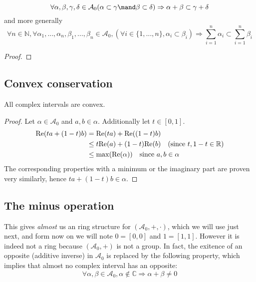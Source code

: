 \begin{prop}[Sum]
    $$\forall \alpha, \beta, \gamma, \delta \in \mathcal{A}_0
    (\alpha \subset \gamma \mand \beta \subset \delta)
    \Rightarrow
    \alpha + \beta \subset \gamma + \delta
    $$
    and more generally
    $$\forall n \in \mathbb N,
    \forall \alpha_1, ..., \alpha_n,
    \beta_1, ..., \beta_n \in \mathcal{A}_0,
    (\forall i \in \{1, ..., n\}, \alpha_i \subset \beta_i)
    \Rightarrow
    \sum_{i=1}^n \alpha_i \subset \sum_{i=1}^n \beta_i
    $$

    \begin{proof}
        
    \end{proof}
\end{prop}

\subsection{Convex conservation}

\begin{prop}

    All complex intervals are convex.

    \begin{proof}
        Let $\alpha \in \mathcal{A}_0$ and $a, b \in \alpha$. Additionally let $t \in [0, 1]$.
        \begin{align*}
        \mathrm{Re}(ta+(1-t)b) &= \mathrm{Re}(ta) + \mathrm{Re}((1-t)b) \\
        &\le t\mathrm{Re}(a) + (1-t)\mathrm{Re}(b) \quad (\text{since}~t, 1-t \in \mathbb{R}) \\
        &\le \max(\mathrm{Re}(\alpha)) \quad \text{since}~a, b \in \alpha
        \end{align*}
        The corresponding properties with a minimum or the imaginary part are proven very similarly, hence $ta+(1-t)b \in \alpha$.
    \end{proof}
\end{prop}

\subsection{The minus operation}

This gives \textit{almost} us an ring structure for $(\mathcal{A}_0, +, \cdot)$, which we will use just next, and form now on we will note $0 = [0, 0]$ and $1 = [1, 1]$. However it is indeed not a ring because $(\mathcal{A}_0, +)$ is not a group. In fact, the exitence of an opposite (additive inverse) in $\mathcal{A}_0$ is replaced by the following property, which implies that almost no complex interval has an opposite:
$$\forall \alpha,\beta \in \mathcal{A}_0, \alpha \not\in \mathbb{C} \Rightarrow \alpha + \beta \not= 0$$

